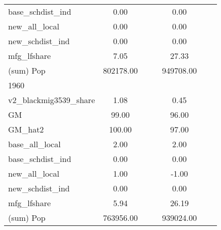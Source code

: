 \begin{table}[htbp]
\begin{tabular}{l*{2}{ccc}}
base\_schdist\_ind    &        0.00&            &            &        0.00&            &            \\
new\_all\_local       &        0.00&            &            &        0.00&            &            \\
new\_schdist\_ind     &        0.00&            &            &        0.00&            &            \\
mfg\_lfshare         &        7.05&            &            &       27.33&            &            \\
(sum) Pop           &   802178.00&            &            &   949708.00&            &            \\
\midrule
1960                &            &            &            &            &            &            \\
v2\_blackmig3539\_share&        1.08&            &            &        0.45&            &            \\
GM                  &       99.00&            &            &       96.00&            &            \\
GM\_hat2             &      100.00&            &            &       97.00&            &            \\
base\_all\_local      &        2.00&            &            &        2.00&            &            \\
base\_schdist\_ind    &        0.00&            &            &        0.00&            &            \\
new\_all\_local       &        1.00&            &            &       -1.00&            &            \\
new\_schdist\_ind     &        0.00&            &            &        0.00&            &            \\
mfg\_lfshare         &        5.94&            &            &       26.19&            &            \\
(sum) Pop           &   763956.00&            &            &   939024.00&            &            \\
\bottomrule
\end{tabular}
\end{table}
